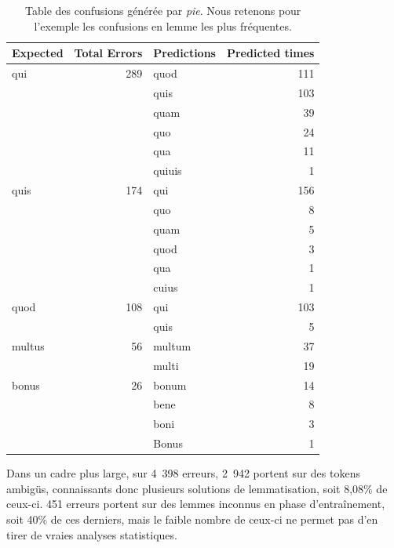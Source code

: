 \begin{table}[]
\begin{tabular}{lrlr}
\toprule
Expected & Total Errors & Predictions & Predicted times \\ \midrule
qui      & 289          & quod        & 111             \\
         &              & quis        & 103             \\
         &              & quam        & 39              \\
         &              & quo         & 24              \\
         &              & qua         & 11              \\
         &              & quiuis      & 1               \\
quis     & 174          & qui         & 156             \\
         &              & quo         & 8               \\
         &              & quam        & 5               \\
         &              & quod        & 3               \\
         &              & qua         & 1               \\
         &              & cuius       & 1               \\
quod     & 108          & qui         & 103             \\
         &              & quis        & 5               \\
multus   & 56           & multum      & 37              \\
         &              & multi       & 19              \\
bonus    & 26           & bonum       & 14              \\
         &              & bene        & 8               \\
         &              & boni        & 3               \\
         &              & Bonus       & 1               \\ \bottomrule
\end{tabular}
\caption{Table des confusions générée par \textit{pie}. Nous retenons pour l'exemple les confusions en lemme les plus fréquentes.}
\label{lemma:confusion-table}
\end{table}

Dans un cadre plus large, sur 4~398 erreurs, 2~942 portent sur des tokens ambigüs, connaissants donc plusieurs solutions de lemmatisation, soit 8,08\% de ceux-ci. 451 erreurs portent sur des lemmes inconnus en phase d'entraînement, soit 40\% de ces derniers, mais le faible nombre de ceux-ci ne permet pas d'en tirer de vraies analyses statistiques.

